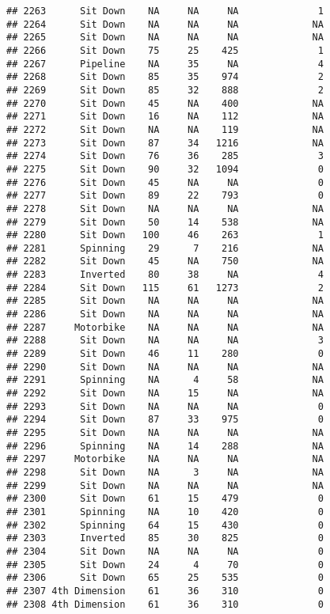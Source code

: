 \documentclass[
]{article}
\begin{document}
\begin{verbatim}
## 2263      Sit Down    NA     NA     NA              1
## 2264      Sit Down    NA     NA     NA             NA
## 2265      Sit Down    NA     NA     NA             NA
## 2266      Sit Down    75     25    425              1
## 2267      Pipeline    NA     35     NA              4
## 2268      Sit Down    85     35    974              2
## 2269      Sit Down    85     32    888              2
## 2270      Sit Down    45     NA    400             NA
## 2271      Sit Down    16     NA    112             NA
## 2272      Sit Down    NA     NA    119             NA
## 2273      Sit Down    87     34   1216             NA
## 2274      Sit Down    76     36    285              3
## 2275      Sit Down    90     32   1094              0
## 2276      Sit Down    45     NA     NA              0
## 2277      Sit Down    89     22    793              0
## 2278      Sit Down    NA     NA     NA             NA
## 2279      Sit Down    50     14    538             NA
## 2280      Sit Down   100     46    263              1
## 2281      Spinning    29      7    216             NA
## 2282      Sit Down    45     NA    750             NA
## 2283      Inverted    80     38     NA              4
## 2284      Sit Down   115     61   1273              2
## 2285      Sit Down    NA     NA     NA             NA
## 2286      Sit Down    NA     NA     NA             NA
## 2287     Motorbike    NA     NA     NA             NA
## 2288      Sit Down    NA     NA     NA              3
## 2289      Sit Down    46     11    280              0
## 2290      Sit Down    NA     NA     NA             NA
## 2291      Spinning    NA      4     58             NA
## 2292      Sit Down    NA     15     NA             NA
## 2293      Sit Down    NA     NA     NA              0
## 2294      Sit Down    87     33    975              0
## 2295      Sit Down    NA     NA     NA             NA
## 2296      Spinning    NA     14    288             NA
## 2297     Motorbike    NA     NA     NA             NA
## 2298      Sit Down    NA      3     NA             NA
## 2299      Sit Down    NA     NA     NA             NA
## 2300      Sit Down    61     15    479              0
## 2301      Spinning    NA     10    420              0
## 2302      Spinning    64     15    430              0
## 2303      Inverted    85     30    825              0
## 2304      Sit Down    NA     NA     NA              0
## 2305      Sit Down    24      4     70              0
## 2306      Sit Down    65     25    535              0
## 2307 4th Dimension    61     36    310              0
## 2308 4th Dimension    61     36    310              0

\end{verbatim}
\end{document}
